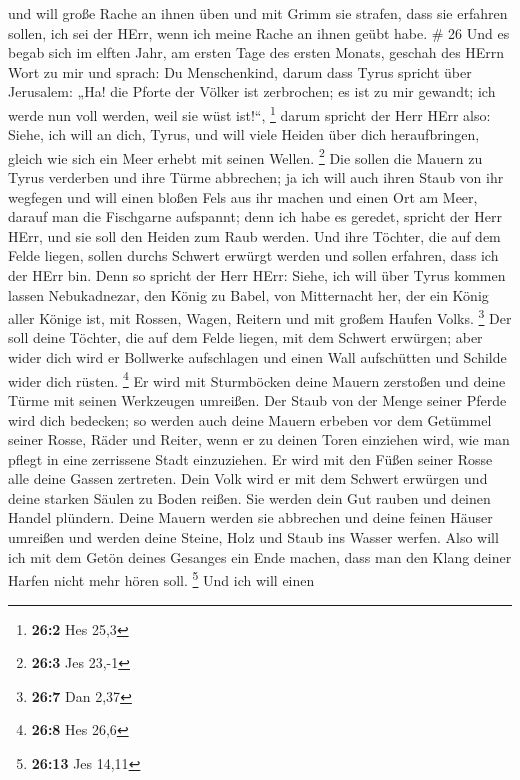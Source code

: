  und will große Rache an ihnen üben und mit Grimm sie
strafen, dass sie erfahren sollen, ich sei der HErr, wenn ich meine
Rache an ihnen geübt habe. \# 26  Und es begab sich im
elften Jahr, am ersten Tage des ersten Monats, geschah des HErrn Wort zu
mir und sprach:  Du Menschenkind, darum dass Tyrus spricht
über Jerusalem: „Ha! die Pforte der Völker ist zerbrochen; es ist zu mir
gewandt; ich werde nun voll werden, weil sie wüst ist!{}``, \footnote{\textbf{26:2}
  Hes 25,3}  darum spricht der Herr HErr also: Siehe, ich
will an dich, Tyrus, und will viele Heiden über dich heraufbringen,
gleich wie sich ein Meer erhebt mit seinen Wellen. \footnote{\textbf{26:3}
  Jes 23,-1}  Die sollen die Mauern zu Tyrus verderben und
ihre Türme abbrechen; ja ich will auch ihren Staub von ihr wegfegen und
will einen bloßen Fels aus ihr machen  und einen Ort am
Meer, darauf man die Fischgarne aufspannt; denn ich habe es geredet,
spricht der Herr HErr, und sie soll den Heiden zum Raub werden.
 Und ihre Töchter, die auf dem Felde liegen, sollen durchs
Schwert erwürgt werden und sollen erfahren, dass ich der HErr bin.
 Denn so spricht der Herr HErr: Siehe, ich will über Tyrus
kommen lassen Nebukadnezar, den König zu Babel, von Mitternacht her, der
ein König aller Könige ist, mit Rossen, Wagen, Reitern und mit großem
Haufen Volks. \footnote{\textbf{26:7} Dan 2,37}  Der soll
deine Töchter, die auf dem Felde liegen, mit dem Schwert erwürgen; aber
wider dich wird er Bollwerke aufschlagen und einen Wall aufschütten und
Schilde wider dich rüsten. \footnote{\textbf{26:8} Hes 26,6}
 Er wird mit Sturmböcken deine Mauern zerstoßen und deine
Türme mit seinen Werkzeugen umreißen.  Der Staub von der
Menge seiner Pferde wird dich bedecken; so werden auch deine Mauern
erbeben vor dem Getümmel seiner Rosse, Räder und Reiter, wenn er zu
deinen Toren einziehen wird, wie man pflegt in eine zerrissene Stadt
einzuziehen.  Er wird mit den Füßen seiner Rosse alle deine
Gassen zertreten. Dein Volk wird er mit dem Schwert erwürgen und deine
starken Säulen zu Boden reißen.  Sie werden dein Gut rauben
und deinen Handel plündern. Deine Mauern werden sie abbrechen und deine
feinen Häuser umreißen und werden deine Steine, Holz und Staub ins
Wasser werfen.  Also will ich mit dem Getön deines Gesanges
ein Ende machen, dass man den Klang deiner Harfen nicht mehr hören soll.
\footnote{\textbf{26:13} Jes 14,11}  Und ich will einen
